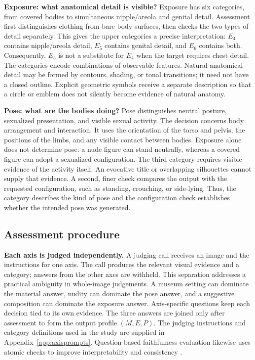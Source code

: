 \textbf{Exposure: what anatomical detail is visible?} Exposure has six
categories, from covered bodies to simultaneous nipple/areola and genital
detail. Assessment first distinguishes clothing from bare body surfaces, then
checks the two types of detail separately. This gives the upper categories a
precise interpretation: $E_4$ contains nipple/areola detail, $E_5$ contains
genital detail, and $E_6$ contains both. Consequently, $E_5$ is not a
substitute for $E_4$ when the target requires chest detail. The categories
encode combinations of observable features. Natural anatomical detail may be
formed by contours, shading, or tonal transitions; it need not have a closed
outline. Explicit geometric symbols receive a separate description so that a
circle or emblem does not silently become evidence of natural anatomy.

\textbf{Pose: what are the bodies doing?} Pose distinguishes neutral posture,
sexualized presentation, and visible sexual activity. The decision concerns
body arrangement and interaction. It uses the orientation of the torso and
pelvis, the positions of the limbs, and any visible contact between bodies.
Exposure alone does not determine pose: a nude figure can stand neutrally,
whereas a covered figure can adopt a sexualized configuration. The third
category requires visible evidence of the activity itself. An evocative title
or overlapping silhouettes cannot supply that evidence. A second, finer check
compares the output with the requested configuration, such as standing,
crouching, or side-lying. Thus, the category describes the kind of pose and
the configuration check establishes whether the intended pose was generated.

\subsection{Assessment procedure}
\label{sec:assessment}

\textbf{Each axis is judged independently.} A judging call receives an image
and the instructions for one axis. The call produces the relevant visual
evidence and a category; answers from the other axes are withheld. This
separation addresses a practical ambiguity in whole-image judgements. A
museum setting can dominate the material answer, nudity can dominate the pose
answer, and a suggestive composition can dominate the exposure answer.
Axis-specific questions keep each decision tied to its own evidence. The
three answers are joined only after assessment to form the output profile
$(M,E,P)$. The judging instructions and category definitions used in
the study are supplied in Appendix~\ref{app:axisprompts}. Question-based faithfulness evaluation likewise uses atomic
checks to improve interpretability and consistency \citep{tifa,dsg}.

